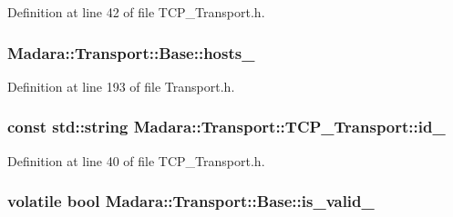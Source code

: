 Definition at line 42 of file TCP\_\-Transport.h.

\hypertarget{classMadara_1_1Transport_1_1Base_a19ac6cbfb41691ad4300a5e696e3b04e}{
\subsubsection[{hosts\_\-}]{ {\bf Madara::Transport::Base::hosts\_\-}}}
\label{dc/d97/classMadara_1_1Transport_1_1Base_a19ac6cbfb41691ad4300a5e696e3b04e}


Definition at line 193 of file Transport.h.

\hypertarget{classMadara_1_1Transport_1_1TCP__Transport_a47c2228f55dda91ba2d554d4034cbe89}{
\subsubsection[{id\_\-}]{\setlength{\rightskip}{0pt plus 5cm}const std::string {\bf Madara::Transport::TCP\_\-Transport::id\_\-}}}
\label{d6/df1/classMadara_1_1Transport_1_1TCP__Transport_a47c2228f55dda91ba2d554d4034cbe89}


Definition at line 40 of file TCP\_\-Transport.h.

\hypertarget{classMadara_1_1Transport_1_1Base_a77696ae1c39c0d0edc169882c4b82c23}{
\subsubsection[{is\_\-valid\_\-}]{\setlength{\rightskip}{0pt plus 5cm}volatile bool {\bf Madara::Transport::Base::is\_\-valid\_\-}}}
\label{dc/d97/classMadara_1_1Transport_1_1Base_a77696ae1c39c0d0edc169882c4b82c23}


